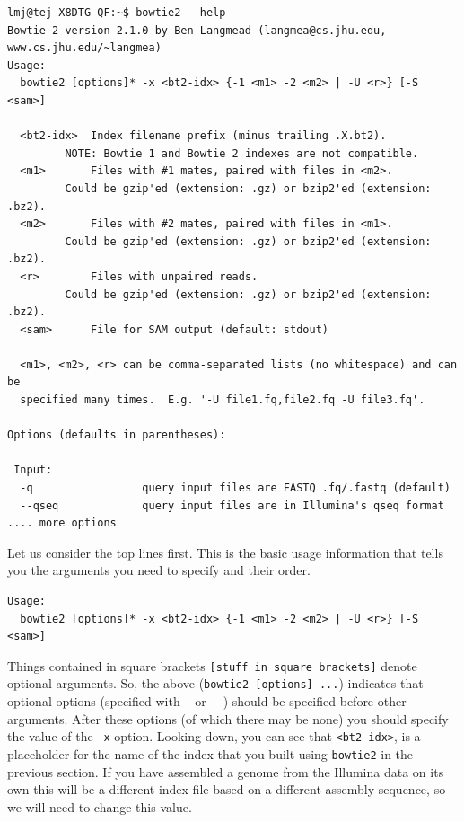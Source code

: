 \documentclass[11pt]{article}
\begin{document}
\begin{verbatim}
lmj@tej-X8DTG-QF:~$ bowtie2 --help
Bowtie 2 version 2.1.0 by Ben Langmead (langmea@cs.jhu.edu, www.cs.jhu.edu/~langmea)
Usage: 
  bowtie2 [options]* -x <bt2-idx> {-1 <m1> -2 <m2> | -U <r>} [-S <sam>]

  <bt2-idx>  Index filename prefix (minus trailing .X.bt2).
	     NOTE: Bowtie 1 and Bowtie 2 indexes are not compatible.
  <m1>       Files with #1 mates, paired with files in <m2>.
	     Could be gzip'ed (extension: .gz) or bzip2'ed (extension: .bz2).
  <m2>       Files with #2 mates, paired with files in <m1>.
	     Could be gzip'ed (extension: .gz) or bzip2'ed (extension: .bz2).
  <r>        Files with unpaired reads.
	     Could be gzip'ed (extension: .gz) or bzip2'ed (extension: .bz2).
  <sam>      File for SAM output (default: stdout)

  <m1>, <m2>, <r> can be comma-separated lists (no whitespace) and can be
  specified many times.  E.g. '-U file1.fq,file2.fq -U file3.fq'.

Options (defaults in parentheses):

 Input:
  -q                 query input files are FASTQ .fq/.fastq (default)
  --qseq             query input files are in Illumina's qseq format
.... more options
\end{verbatim}

Let us consider the top lines first. This is the basic usage information
that tells you the arguments you need to specify and their order.

\begin{verbatim}
Usage: 
  bowtie2 [options]* -x <bt2-idx> {-1 <m1> -2 <m2> | -U <r>} [-S <sam>]
\end{verbatim}

Things contained in square brackets \texttt{[stuff in square brackets]} denote
optional arguments. So, the above (\texttt{bowtie2 [options] ...}) indicates that optional options (specified
with \texttt{-} or \texttt{-{}-}) should be specified before other arguments. After these
options (of which there may be none) you should specify the value of the \texttt{-x}
option. Looking down, you can see that \texttt{<bt2-idx>}, is a placeholder for
the name of the index that you built using \texttt{bowtie2} in the
previous section. If you have assembled a genome from the Illumina data on
its own this will be a different index file based on a different assembly
sequence, so we will need to change this value.
\end{document}
